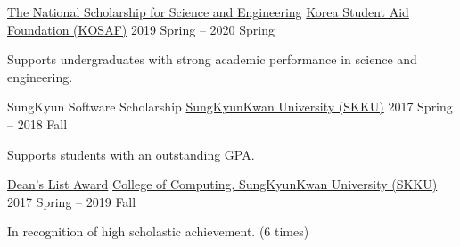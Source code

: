 \documentclass[11pt, a4paper]{cv}
\begin{document}
\begin{cventries}

  \cvhonor
    {\href{https://www.kosaf.go.kr/eng/jsp/aid/aid02_01_01.jsp}{The National Scholarship for Science and Engineering}} %
    {\href{https://www.kosaf.go.kr/eng/jsp/main.jsp}{Korea Student Aid Foundation (KOSAF)}} %
    {2019 Spring -- 2020 Spring} %
    {
      \begin{cvitems} %
        \item {Supports undergraduates with strong academic performance in science and engineering.}
      \end{cvitems}
    }

  \cvhonor
    {SungKyun Software Scholarship} %
    {\href{https://www.skku.edu/eng/}{SungKyunKwan University (SKKU)}} %
    {2017 Spring -- 2018 Fall} %
    {
      \begin{cvitems} %
        \item {Supports students with an outstanding GPA.}
      \end{cvitems}
    }

  \cvhonor
    {\href{https://cs.skku.edu/en/edures/education/view/4137}{Dean's List Award}} %
    {\href{https://cs.skku.edu/en}{College of Computing, SungKyunKwan University (SKKU)}} %
    {2017 Spring -- 2019 Fall} %
    {
      \begin{cvitems} %
        \item {In recognition of high scholastic achievement. (6 times)}
      \end{cvitems}
    }

\end{cventries}



\vspace{-2mm}
\end{document}

